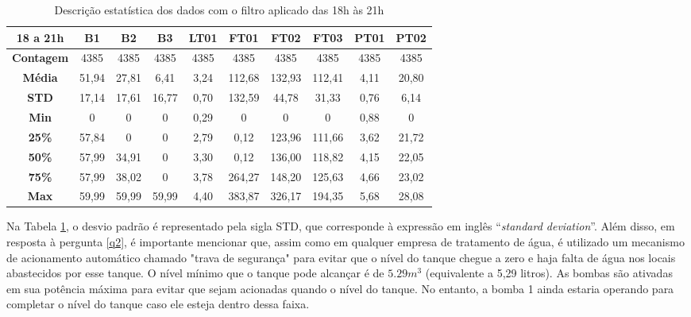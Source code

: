\begin{table}[htp!]
	\centering
	\caption{Descrição estatística dos dados com o filtro aplicado das 18h às 21h}\label{tb:est}
	\begin{tabular}{@{}cccccccccc@{}}
		\toprule
		\textbf{18 a 21h}  & \textbf{B1} & \textbf{B2} & \textbf{B3} & \textbf{LT01} & \textbf{FT01} & \textbf{FT02} & \textbf{FT03} & \textbf{PT01} & \textbf{PT02} \\ \midrule
		\textbf{Contagem} & 4385    & 4385     & 4385     & 4385      & 4385       & 4385       & 4385       & 4385       & 4385       \\
		\textbf{Média}      & 51,94       & 27,81       & 6,41        & 3,24          & 112,68        & 132,93        & 112,41        & 4,11          & 20,80         \\
		\textbf{STD}       & 17,14       & 17,61       & 16,77       & 0,70          & 132,59        & 44,78         & 31,33         & 0,76          & 6,14          \\
		\textbf{Min}       & 0           & 0           & 0           & 0,29          & 0             & 0             & 0             & 0,88          & 0             \\
		\textbf{25\%}      & 57,84       & 0           & 0           & 2,79          & 0,12          & 123,96        & 111,66        & 3,62          & 21,72         \\
		\textbf{50\%}      & 57,99       & 34,91       & 0           & 3,30          & 0,12          & 136,00        & 118,82        & 4,15          & 22,05         \\
		\textbf{75\%}      & 57,99       & 38,02       & 0           & 3,78          & 264,27        & 148,20        & 125,63        & 4,66          & 23,02         \\
		\textbf{Max}       & 59,99       & 59,99       & 59,99       & 4,40          & 383,87        & 326,17        & 194,35        & 5,68          & 28,08         \\ \bottomrule
	\end{tabular}
	
\end{table}



Na Tabela \ref{tb:est}, o desvio padrão é representado pela sigla STD, que corresponde à expressão em inglês ``\textit{standard deviation}''. Além disso, em resposta à pergunta \ref{q2}, é importante mencionar que, assim como em qualquer empresa de tratamento de água, é utilizado um mecanismo de acionamento automático chamado "trava de segurança" para evitar que o nível do tanque chegue a zero e haja falta de água nos locais abastecidos por esse tanque. O nível mínimo que o tanque pode alcançar é de $5.29 m^3$ (equivalente a 5,29 litros). As bombas são ativadas em sua potência máxima para evitar que sejam acionadas quando o nível do tanque. No entanto, a bomba 1 ainda estaria operando para completar o nível do tanque caso ele esteja dentro dessa faixa.

